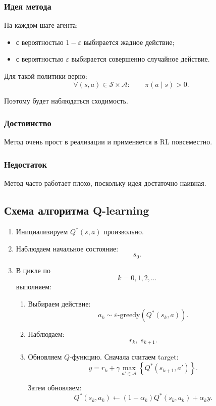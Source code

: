 \documentclass[12pt,a4paper]{article}
\begin{document}
\subsubsection{Идея метода}

На каждом шаге агента:
\begin{itemize}
    \item с вероятностью $1-\varepsilon$ выбирается жадное действие;
    \item с вероятностью $\varepsilon$ выбирается совершенно случайное действие.
\end{itemize}

Для такой политики верно:
\[
\forall (s,a) \in \mathcal S \times \mathcal A:
\qquad
\pi(a\mid s)>0.
\]

Поэтому будет наблюдаться сходимость.

\subsubsection{Достоинство}

Метод очень прост в реализации и применяется в RL повсеместно.

\subsubsection{Недостаток}

Метод часто работает плохо, поскольку идея достаточно наивная.

\subsection{Схема алгоритма Q-learning}

\begin{enumerate}
    \item Инициализируем $Q^\ast(s,a)$ произвольно.

    \item Наблюдаем начальное состояние:
    \[
    s_0.
    \]

    \item В цикле по
    \[
    k = 0,1,2,\ldots
    \]
    выполняем:
    \begin{enumerate}
        \item Выбираем действие:
        \[
        a_k
        \sim
        \varepsilon\text{-greedy}
        \left(
        Q^\ast(s_k,a)
        \right).
        \]

        \item Наблюдаем:
        \[
        r_k,\; s_{k+1}.
        \]

        \item Обновляем $Q$-функцию. Сначала считаем target:
        \[
        y
        =
        r_k
        +
        \gamma
        \max_{a' \in \mathcal A}
        \left\{
        Q^\ast(s_{k+1},a')
        \right\}.
        \]

        Затем обновляем:
        \[
        Q^\ast(s_k,a_k)
        \leftarrow
        (1-\alpha_k)Q^\ast(s_k,a_k)
        +
        \alpha_k y.
        \]
    \end{enumerate}
\end{enumerate}
\end{document}
